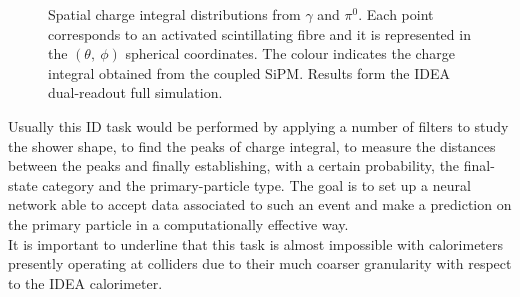 \begin{figure}
	\centering
	 \quad
	\caption{Spatial charge integral distributions from $\gamma$ and $\pi^0$. Each point corresponds to an activated scintillating fibre and it is represented in the $(\theta,~ \phi)$ spherical coordinates. The colour indicates the charge integral obtained from the coupled SiPM. Results form the IDEA dual-readout full simulation.}
	\label{fig:demo_shower}
\end{figure}

Usually this ID task would be performed by applying a number of filters to study the shower shape, to find the peaks of charge integral, to measure the distances between the peaks and finally establishing, with a certain probability, the final-state category and the primary-particle type. The goal is to set up a neural network able to accept data associated to such an event and make a prediction on the primary particle in a computationally effective way.\\

It is important to underline that this task is almost impossible with calorimeters presently operating at colliders due to their much coarser granularity with respect to the IDEA calorimeter.


